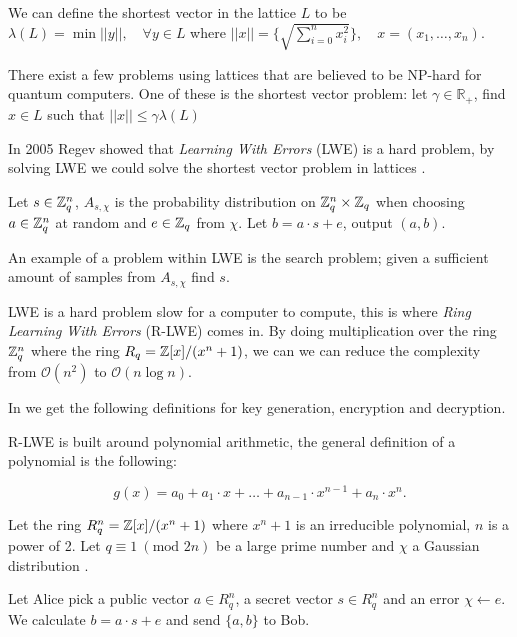 We can define the shortest vector in the lattice $L$ to be
$\lambda(L) = \min || y ||, \quad \forall y \in L$ where
$||x|| = \{\sqrt{\sum_{i=0}^n x^2_i}\}, \quad x = (x_1, \ldots, x_n)$.

There exist a few problems using lattices that are believed to be NP-hard for
quantum computers. One of these is the shortest vector problem: let $\gamma \in
\mathbb{R}_+$, find $x \in L$
such that $||x|| \leq \gamma \lambda(L)$

In 2005 Regev showed that \textit{Learning With Errors} (LWE) is a hard
problem, by solving LWE we could solve the shortest vector problem in lattices
\citep{Regev05}.


\begin{definition}

    Let $s \in \mathbb{Z}^n_q$, $A_{s, \chi}$ is the probability distribution on
    $\mathbb{Z}^n_q \times \mathbb{Z}_q$ when choosing $a \in \mathbb{Z}^n_q$ at random and $e \in
    \mathbb{Z}_q$ from $\chi$. Let $b = a \cdot s + e$, output $(a,b)$.


\end{definition}

An example of a problem within LWE is the search problem; given a sufficient
amount of samples from $A_{s, \chi}$ find $s$.

LWE is a hard problem  slow for a computer to compute, this is where
\textit{Ring Learning With Errors} (R-LWE) comes in. By doing multiplication
over the ring $\mathbb{Z}^n_q$ where the ring $R_q = \mathbb{Z}[x] / (x^n + 1)$, we can we can
reduce the complexity from $\mathcal{O}(n^2)$ to $\mathcal{O}(n\log n)$.

In \citep{FPGA_Post_Quantum_Primitives} we get the following definitions for key
generation, encryption and decryption.

\begin{definition}
    R-LWE is built around polynomial arithmetic, the general definition of a
    polynomial is the following:

    \[
        g(x) = a_0 + a_1 \cdot x + \ldots + a_{n-1} \cdot x^{n-1} + a_n \cdot
        x^n.
    \]

    Let the ring $R_q^n = \mathbb{Z}[x]/(x^n + 1)$ where $x^n + 1$ is an irreducible
    polynomial, $n$ is a power of 2. Let $q \equiv 1\ (\text{mod } 2n)$ be a
    large prime number and $\chi$ a Gaussian distribution
    \citep{FPGA_Post_Quantum_Primitives}.

    Let Alice pick a public vector $a \in R_q^n$, a secret vector $s \in R_q^n$
    and an error $\chi \leftarrow e$. We calculate $b = a \cdot s + e$ and send
    $\{a,b\}$ to Bob.


\end{definition}

